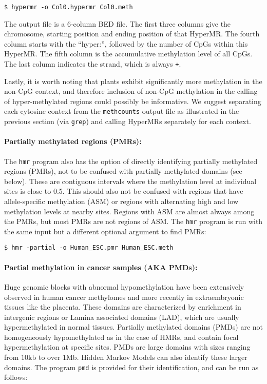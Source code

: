 \documentclass[10pt]{article}
\newcommand{\prog}[1]{\texttt{#1}}
\newcommand{\lit}[1]{\texttt{#1}}
\begin{document}
\begin{verbatim}
$ hypermr -o Col0.hypermr Col0.meth
\end{verbatim}

The output file is a 6-column BED file. The first three columns give
the chromosome, starting position and ending position of that
HyperMR. The fourth column starts with the ``hyper:'', followed by the
number of CpGs within this HyperMR. The fifth column is the
accumulative methylation level of all CpGs. The last column indicates
the strand, which is always \lit{+}.

Lastly, it is worth noting that plants exhibit significantly more
methylation in the non-CpG context, and therefore inclusion of non-CpG
methylation in the calling of hyper-methylated regions could possibly
be informative. We suggest separating each cytosine context from the
\prog{methcounts} output file as illustrated in the previous section
(via \prog{grep}) and calling HyperMRs separately for each context.

\paragraph{Partially methylated regions (PMRs):}
The \prog{hmr} program also has the option of directly identifying
partially methylated regions (PMRs), not to be confused with partially
methylated domains (see below). These are contiguous intervals where
the methylation level at individual sites is close to 0.5. This should
also not be confused with regions that have allele-specific
methylation (ASM) or regions with alternating high and low methylation
levels at nearby sites. Regions with ASM are almost always among the
PMRs, but most PMRs are not regions of ASM. The \prog{hmr} program is
run with the same input but a different optional argument to find
PMRs:
\begin{verbatim}
$ hmr -partial -o Human_ESC.pmr Human_ESC.meth
\end{verbatim}


\paragraph{Partial methylation in cancer samples (AKA PMDs):}

Huge genomic blocks with abnormal hypomethylation have been
extensively observed in human cancer methylomes and more recently in
extraembryonic tissues like the placenta. These domains are
characterized by enrichment in intergenic regions or Lamina associated
domains (LAD), which are usually hypermethylated in normal
tissues. Partially methylated domains (PMDs) are not homogeneously
hypomethylated as in the case of HMRs, and contain focal
hypermethylation at specific sites. PMDs are large domains with sizes
ranging from $10$kb to over $1$Mb.  Hidden Markov Models can also
identify these larger domains. The program \prog{pmd} is provided for
their identification, and can be run as follows:
\end{document}
